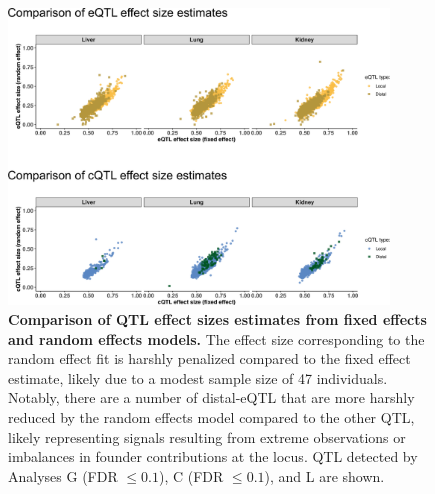 \documentclass[10pt,letterpaper,twoside]{article}
\begin{document}
\begin{figure}[hp]
\renewcommand{\familydefault}{\sfdefault}\normalfont
\centering
\includegraphics[width=0.9\textwidth, trim={0in 0in 0in 0in}, clip]{figs/fixefvsranef_qtl.png}
\caption{\textbf{Comparison of QTL effect sizes estimates from fixed effects and random effects models.} 
The effect size corresponding to the random effect fit is harshly penalized compared to the fixed effect estimate, likely due to a modest sample size of 47 individuals. Notably, there are a number of distal-eQTL that are more harshly reduced by the random effects model compared to the other QTL, likely representing signals resulting from extreme observations or imbalances in founder contributions at the locus. QTL detected by Analyses G (FDR $\le 0.1$), C (FDR $\le 0.1$), and L are shown.
\label{fig:qtl_effect_size_fixefvsranef}}
\end{figure}
\end{document}
